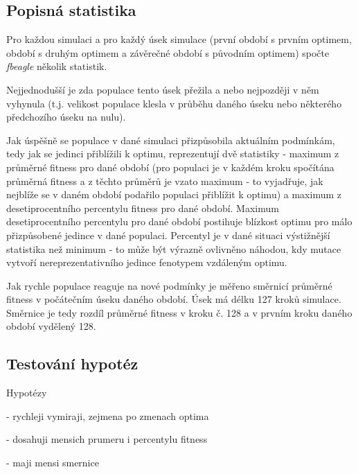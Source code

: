 \subsection{Popisná statistika}

Pro každou simulaci a pro každý úsek simulace (první období s prvním optimem,
období s druhým optimem a závěrečné období s původním optimem) spočte \textit{fbeagle} několik statistik.

Nejjednodušší je zda populace tento úsek přežila a nebo nejpozději v něm vyhynula
(t.j. velikost populace klesla v průběhu daného úseku nebo některého předchozího úseku na nulu).

Jak úspěšně se populace v dané simulaci přizpůsobila aktuálním podmínkám, tedy jak se jedinci přiblížili k optimu,
reprezentují dvě statistiky - maximum z průměrné fitness pro dané období (pro populaci je v každém kroku
spočítána průměrná fitness a z těchto průměrů je vzato maximum - to vyjadřuje, jak nejblíže se v daném období podařilo
populaci přiblížit k optimu) a maximum z desetiprocentního percentylu fitness pro dané období.
Maximum desetiprocentního percentylu pro dané období postihuje blízkost optimu pro
málo přizpůsobené jedince v dané populaci. Percentyl je v dané situaci výstižnější statistika než minimum - to může
být výrazně ovlivněno náhodou, kdy mutace vytvoří nereprezentativního jedince fenotypem vzdáleným optimu.

Jak rychle populace reaguje na nové podmínky je měřeno směrnicí průměrné fitness v počátečním úseku daného období.
Úsek má délku 127 kroků simulace. Směrnice je tedy rozdíl průměrné fitness v kroku č. 128 a v prvním kroku daného
období vydělený 128.

\subsection{Testování hypotéz}

Hypotézy

- rychleji vymiraji, zejmena po zmenach optima

- dosahuji mensich prumeru i percentylu fitness

- maji mensi smernice